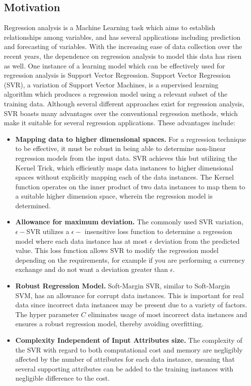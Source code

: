 \documentclass[12pt]{article}
\begin{document}
\subsection{Motivation}
Regression analysis is a Machine Learning task which aims to establish relationships among variables, and has several applications including prediction and forecasting of variables. With the increasing ease of data collection over the recent years, the dependence on regression analysis to model this data has risen as well. One instance of a learning model which can be effectively used for regression analysis is Support Vector Regression.
\newline\newline
Support Vector Regression (SVR), a variation of Support Vector Machines, is a supervised learning algorithm which produces a regression model using a relevant subset of the training data. Although several different approaches exist for regression analysis, SVR boasts many advantages over the conventional regression methods, which make it suitable for several regression applications. These advantages include:
\begin{itemize}
\item {\bf Mapping data to higher dimensional spaces.}
For a regression technique to be effective, it must be robust in being able to determine non-linear regression models from the input data.
SVR achieves this but utilizing the Kernel Trick, which efficiently maps data instances to higher dimensional spaces without explicitly mapping each of the data instances. The Kernel function operates on the inner product of two data instances to map them to a suitable higher dimension space, wherein the regression model is determined.
\item {\bf Allowance for maximum deviation.}
The commonly used SVR variation, $\epsilon-$SVR utilizes a $\epsilon-$ insensitive loss function to determine a regression model where each data instance has at most $\epsilon$ deviation from the predicted value. This loss function allows SVR to modify the regression model depending on the requirements, for example if you are performing a currency exchange and do not want a deviation greater than $\epsilon$.
\item {\bf Robust Regression Model.}
Soft-Margin SVR, similar to Soft-Margin SVM, has an allowance for corrupt data instances. This is important for real data since incorrect data instances may be present due to a variety of factors. The hyper parameter $C$ eliminates usage of most incorrect data instances and ensures a robust regression model, thereby avoiding overfitting.
\item  {\bf Complexity Independent of Input Attributes size.}
The complexity of the SVR with regard to both computational cost and memory are negligibly affected by the number of attributes for each data instance, meaning that several supporting attributes can be added to the training instances with negligible difference to the cost.
\end{itemize}
\end{document}
